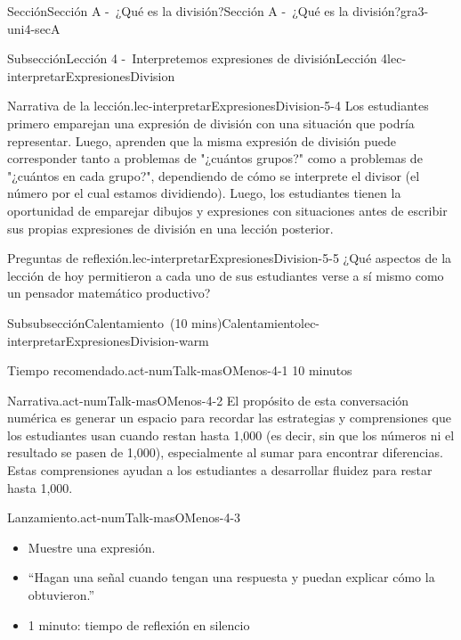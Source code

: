 \documentclass[oneside,10pt,]{article}
\begin{document}
\begin{sectionptx}{Sección}{Sección A -~¿Qué es la división?}{}{Sección A -~¿Qué es la división?}{}{}{gra3-uni4-secA}
\begin{subsectionptx}{Subsección}{Lección 4 -~Interpretemos expresiones de división}{}{Lección 4}{}{}{lec-interpretarExpresionesDivision}
\begin{introduction}{}
\begin{paragraphs}{Narrativa de la lección.}{lec-interpretarExpresionesDivision-5-4}
Los estudiantes primero emparejan una expresión de división con una situación que podría representar. Luego, aprenden que la misma expresión de división puede corresponder tanto a problemas de "¿cuántos grupos?" como a problemas de "¿cuántos en cada grupo?", dependiendo de cómo se interprete el divisor (el número por el cual estamos dividiendo). Luego, los estudiantes tienen la oportunidad de emparejar dibujos y expresiones con situaciones antes de escribir sus propias expresiones de división en una lección posterior.%
\end{paragraphs}%
\begin{paragraphs}{Preguntas de reflexión.}{lec-interpretarExpresionesDivision-5-5}%
¿Qué aspectos de la lección de hoy permitieron a cada uno de sus estudiantes verse a sí mismo como un pensador matemático productivo?%
\end{paragraphs}%
\end{introduction}%
%
%
\typeout{************************************************}
\typeout{************************************************}
%
\begin{subsubsectionptx}{Subsubsección}{Calentamiento~(10 mins)}{}{Calentamiento}{}{}{lec-interpretarExpresionesDivision-warm}
\par
\begin{paragraphs}{Tiempo recomendado.}{act-numTalk-masOMenos-4-1}%
10 minutos%
\end{paragraphs}%
\begin{paragraphs}{Narrativa.}{act-numTalk-masOMenos-4-2}%
El propósito de esta conversación numérica es generar un espacio para recordar las estrategias y comprensiones que los estudiantes usan cuando restan hasta 1,000 (es decir, sin que los números ni el resultado se pasen de 1,000), especialmente al sumar para encontrar diferencias. Estas comprensiones ayudan a los estudiantes a desarrollar fluidez para restar hasta 1,000.%
\end{paragraphs}%
\begin{paragraphs}{Lanzamiento.}{act-numTalk-masOMenos-4-3}%
%
\begin{itemize}[label=\textbullet]
\item{}Muestre una expresión.%
\item{}``Hagan una señal cuando tengan una respuesta y puedan explicar cómo la obtuvieron.''%
\item{}1 minuto: tiempo de reflexión en silencio%
\end{itemize}
\end{paragraphs}%

\end{subsubsectionptx}
\end{subsectionptx}
\end{sectionptx}
\end{document}
